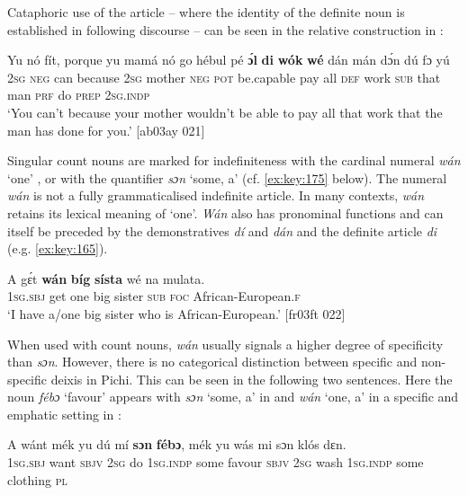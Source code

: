 Cataphoric use of the article – where the identity of the definite noun is established in following discourse – can be seen in the relative construction in : 


\ea%
    \label{ex:key:173}
    \gll Yu  nó  fít,  porque  yu  mamá  nó  go  hébul    pé  \textbf{ɔ́l}
\textbf{di}  \textbf{wók}    \textbf{wé}  dán  mán    dɔ́n  dú  fɔ  yú\\
\textsc{2sg}  \textsc{neg}  can  because  \textsc{2sg}  mother  \textsc{neg}  \textsc{pot}  be.capable  pay  all
\textsc{def}  work  \textsc{sub}  that  man    \textsc{prf}  do  \textsc{prep}  \textsc{2sg.indp}\\

\glt ‘You can’t because your mother wouldn’t be able to pay all that work 
that the man has done for you.’ [ab03ay 021]
\z

Singular count nouns are marked for indefiniteness with the cardinal numeral \textit{wán} ‘one’ , or with the quantifier \textit{sɔn} ‘some, a’ (cf. \ref{ex:key:175} below). The numeral \textit{wán} is not a fully grammaticalised indefinite article. In many contexts, \textit{wán} retains its lexical meaning of ‘one’. \textit{Wán} also has pronominal functions and can itself be preceded by the demonstratives \textit{dí} and \textit{dán} and the definite article \textit{di} (e.g. \ref{ex:key:165}).


\ea%
    \label{ex:key:174}
    \gll A    gɛ́t  \textbf{wán}  \textbf{bíg}  \textbf{sísta}  wé  na  mulata.\\
\textsc{1sg.sbj}  get  one  big  sister  \textsc{sub}  \textsc{foc}  African-European.\textsc{f}\\

\glt ‘I have a/one big sister who is African-European.’ [fr03ft 022]
\z

When used with count nouns, \textit{wán} usually signals a higher degree of specificity than \textit{sɔn}. However, there is no categorical distinction between specific and non-specific deixis in Pichi. This can be seen in the following two sentences. Here the noun \textit{fébɔ} ‘favour’ appears with \textit{sɔn} ‘some, a’ in  and \textit{wán} ‘one, a’ in a specific and emphatic setting in : 


\ea%
    \label{ex:key:175}
    \gll A    wánt  mék    yu  dú  mí    \textbf{sɔn} \textbf{    fébɔ},
mék    yu  wás    mi    sɔn    klós    dɛn.\\
\textsc{1sg.sbj}  want  \textsc{sbjv}    \textsc{2sg}  do  \textsc{1sg.indp}  some  favour
\textsc{sbjv}    \textsc{2sg}  wash  \textsc{1sg.indp}  some  clothing  \textsc{pl}\\

